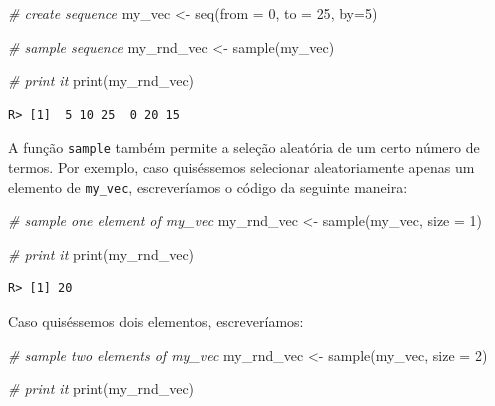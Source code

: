 \documentclass[
  11pt,
]{book}
\newenvironment{Shaded}{\begin{snugshade}}{\end{snugshade}}
\newcommand{\AttributeTok}[1]{\textcolor[rgb]{0.61,0.61,0.61}{#1}}
\newcommand{\CommentTok}[1]{\textcolor[rgb]{0.37,0.37,0.37}{\textit{#1}}}
\newcommand{\DecValTok}[1]{\textcolor[rgb]{0.06,0.06,0.06}{#1}}
\newcommand{\FunctionTok}[1]{\textcolor[rgb]{0,0,0}{#1}}
\newcommand{\NormalTok}[1]{#1}
\newcommand{\OtherTok}[1]{\textcolor[rgb]{0.37,0.37,0.37}{#1}}
\begin{document}
\begin{Shaded}
\begin{Highlighting}[]
\CommentTok{\# create sequence}
\NormalTok{my\_vec }\OtherTok{\textless{}{-}} \FunctionTok{seq}\NormalTok{(}\AttributeTok{from =} \DecValTok{0}\NormalTok{, }\AttributeTok{to =} \DecValTok{25}\NormalTok{, }\AttributeTok{by=}\DecValTok{5}\NormalTok{)}

\CommentTok{\# sample sequence}
\NormalTok{my\_rnd\_vec }\OtherTok{\textless{}{-}} \FunctionTok{sample}\NormalTok{(my\_vec)}

\CommentTok{\# print it}
\FunctionTok{print}\NormalTok{(my\_rnd\_vec)}
\end{Highlighting}
\end{Shaded}

\begin{verbatim}
R> [1]  5 10 25  0 20 15
\end{verbatim}

A função \texttt{sample} também permite a seleção aleatória de um certo número de termos. Por exemplo, caso quiséssemos selecionar aleatoriamente apenas um elemento de \texttt{my\_vec}, escreveríamos o código da seguinte maneira:

\begin{Shaded}
\begin{Highlighting}[]
\CommentTok{\# sample one element of my\_vec}
\NormalTok{my\_rnd\_vec }\OtherTok{\textless{}{-}} \FunctionTok{sample}\NormalTok{(my\_vec, }\AttributeTok{size =} \DecValTok{1}\NormalTok{)}

\CommentTok{\# print it}
\FunctionTok{print}\NormalTok{(my\_rnd\_vec)}
\end{Highlighting}
\end{Shaded}

\begin{verbatim}
R> [1] 20
\end{verbatim}

Caso quiséssemos dois elementos, escreveríamos:

\begin{Shaded}
\begin{Highlighting}[]
\CommentTok{\# sample two elements of my\_vec}
\NormalTok{my\_rnd\_vec }\OtherTok{\textless{}{-}} \FunctionTok{sample}\NormalTok{(my\_vec, }\AttributeTok{size =} \DecValTok{2}\NormalTok{)}

\CommentTok{\# print it}
\FunctionTok{print}\NormalTok{(my\_rnd\_vec)}
\end{Highlighting}
\end{Shaded}
\end{document}
